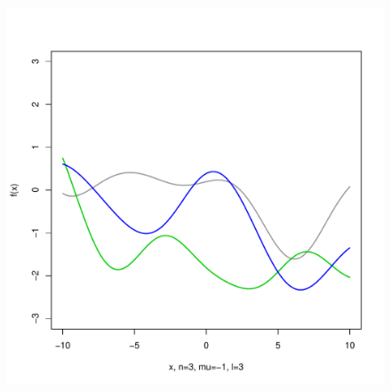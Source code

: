 \documentclass[12pt,letterpaper]{article}
\begin{document}
\begin{figure}
\begin{center}
\includegraphics[scale=0.2]{hw321/n3-m-1-l3.pdf}
\end{center}
\end{figure}
\end{document}
